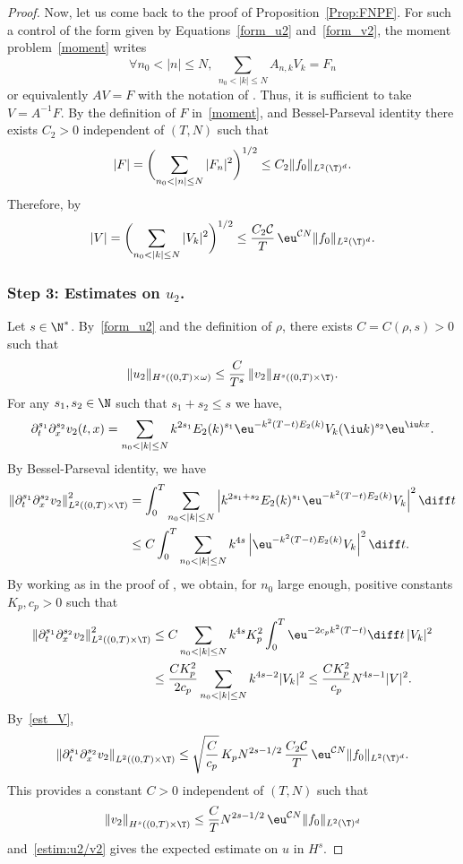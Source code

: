 \begin{proof}
Now, let us come back to the proof of Proposition~\ref{Prop:FNPF}.
For such a control of the form given by Equations~\eqref{form_u2} and~\eqref{form_v2}, the moment problem~\eqref{moment} writes
\[
\forall n_0 < |n|\leq N, \
\sum_{n_0 < |k|\leq N} A_{n,k} V_k = F_n
\]
or equivalently $AV=F$ with the notation of .
Thus, it is sufficient to take $V=A^{-1}F$.
By the definition of $F$ in~\eqref{moment}, and Bessel-Parseval identity there exists $C_2>0$ independent of $(T,N)$ such that
\[
|F| = \biggl(\sum_{n_0<|n|\leq N} |F_n|^2 \biggr)^{1/2} \leq C_2 \|f_0\|_{L^2(\T)^d}.
\]
Therefore, by 
\begin{equation}\label{est_V}
|V| = \biggl(\sum_{n_0<|k|\leq N} |V_k|^2 \biggr)^{1/2} \leq \frac{C_2 \mathcal{C} }{T}\, \eu^{\mathcal{C}N} \|f_0 \|_{L^2(\T)^d}.
\end{equation}

\subsubsection*{Step 3: Estimates on $u_2$.} Let $s\in\N^*$. By~\eqref{form_u2} and the definition of $\rho$,
there exists $C=C(\rho,s)>0$ such that
\begin{equation} \label{estim:u2/v2}
\| u_2 \|_{H^s((0,T)\times\omega)} \leq \frac{C}{T^s}\, \|v_2\|_{H^s((0,T)\times\T)}.
\end{equation}
For any $s_1, s_2 \in \N$ such that $s_1+s_2 \leq s$ we have,
\[
\partial_t^{s_1} \partial_x^{s_2} v_2 (t,x) =
\sum_{n_0<|k|\leq N} k^{2s_1} E_2(k)^{s_1} \eu^{-k^2(T-t)E_2(k)} V_k (\iu k)^{s_2} \eu^{\iu kx}.
\]
By Bessel-Parseval identity, we have
\begin{align*}
\left\| \partial_t^{s_1} \partial_x^{s_2} v_2 \right\|_{L^2((0,T)\times\T)}^2
& = \int_0^T \sum_{n_0<|k|\leq N} \left| k^{2s_1+s_2} E_2(k)^{s_1} \eu^{-k^2(T-t)E_2(k)} V_k \right|^2 \diff t\\
& \leq C \int_0^T \sum_{n_0<|k|\leq N} k^{4s} \left| \eu^{-k^2(T-t)E_2(k)} V_k\right|^2 \diff t.
\end{align*}
By working as in the proof of , we obtain, for $n_0$ large enough, positive constants $K_p, c_p>0$ such that
\begin{align*}
\left\| \partial_t^{s_1} \partial_x^{s_2} v_2 \right\|_{L^2((0,T)\times\T)}^2
& \leq C \sum_{n_0<|k|\leq N} k^{4s} K_p^2 \int_0^T \eu^{-2c_pk^2(T-t)} \diff t\, |V_k|^2 \\
& \leq \frac{C K_p^2}{2c_p} \sum_{n_0<|k|\leq N} k^{4s-2} |V_k|^2 \leq \frac{C K_p^2}{c_p} N^{4s-1} |V|^2.
\end{align*}
By~\eqref{est_V},
\[
\left\|\partial_t^{s_1} \partial_x^{s_2} v_2 \right\|_{L^2((0,T)\times\T)}
\leq \sqrt{\frac{C}{c_p}}\, K_p N^{2s-1/2}\, \frac{C_2 \mathcal{C} }{T}\, \eu^{\mathcal{C}N} \|f_0 \|_{L^2(\T)^d}.
\]
This provides a constant $C>0$ independent of $(T,N)$ such that
\[
\left\| v_2 \right\|_{H^s((0,T)\times\T)}
\leq \frac{C}{T} N^{2s-1/2}\, \eu^{\mathcal{C}N} \|f_0 \|_{L^2(\T)^d}
\]
and~\eqref{estim:u2/v2} gives the expected estimate on $u$ in $H^s$.
\end{proof}

